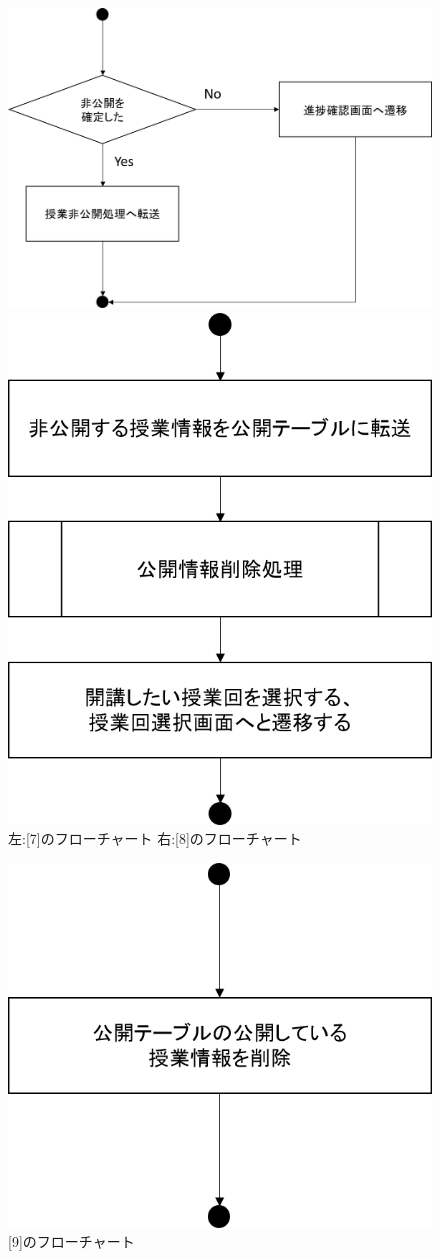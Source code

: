 \begin{figure}[htbp]
 \begin{minipage}{0.5\hsize}
  \begin{center}
   \includegraphics[width=0.45\linewidth,clip]{./img/start_lecture/sub7.png}
  \end{center}
 \end{minipage}
 \begin{minipage}{0.5\hsize}
  \begin{center}
   \includegraphics[width=0.45\linewidth,clip]{./img/start_lecture/sub8.png}
  \end{center}
 \end{minipage}
 \caption{左:[7]のフローチャート 右:[8]のフローチャート}\label{fig:startlectureflow3}
\end{figure}

\begin{figure}[htbp]
  \begin{center}
    \includegraphics[width=0.45\linewidth,clip]{./img/start_lecture/sub9.png}
    \caption{[9]のフローチャート}\label{fig:startlectureflow1}
  \end{center}
\end{figure}







